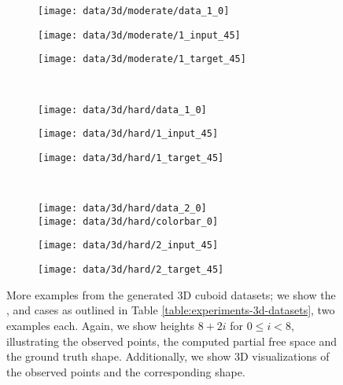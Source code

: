 \begin{figure}[h]
  \begin{subfigure}[t]{0.425\textwidth}
    \vspace{0px}
    \texttt{[image: data/3d/moderate/data\_1\_0]}
  \end{subfigure}
  \begin{subfigure}[t]{0.2\textwidth}
    \vspace{0px}
    \texttt{[image: data/3d/moderate/1\_input\_45]}
  \end{subfigure}
  \begin{subfigure}[t]{0.2\textwidth}
    \vspace{0px}
    \texttt{[image: data/3d/moderate/1\_target\_45]}
  \end{subfigure}\\
  \begin{subfigure}[t]{0.425\textwidth}
    \vspace{0px}
    \texttt{[image: data/3d/hard/data\_1\_0]}
  \end{subfigure}
  \begin{subfigure}[t]{0.2\textwidth}
    \vspace{0px}
    \texttt{[image: data/3d/hard/1\_input\_45]}
  \end{subfigure}
  \begin{subfigure}[t]{0.2\textwidth}
    \vspace{0px}
    \texttt{[image: data/3d/hard/1\_target\_45]}
  \end{subfigure}\\
  \begin{subfigure}[t]{0.425\textwidth}
    \vspace{0px}
    \texttt{[image: data/3d/hard/data\_2\_0]}\\
    \hspace*{-0.25cm}\texttt{[image: data/3d/hard/colorbar\_0]}
  \end{subfigure}
  \begin{subfigure}[t]{0.2\textwidth}
    \vspace{0px}
    \texttt{[image: data/3d/hard/2\_input\_45]}
  \end{subfigure}
  \begin{subfigure}[t]{0.2\textwidth}
    \vspace{0px}
    \texttt{[image: data/3d/hard/2\_target\_45]}
  \end{subfigure}
  
  \caption{More examples from the generated 3D cuboid datasets; we show the \easy,
  \moderate and \hard cases as outlined in Table \ref{table:experiments-3d-datasets},
  two examples each. Again, we show heights $8 + 2i$ for $0 \leq i < 8$, illustrating the
  observed points, the computed partial free space and the ground truth shape.
  Additionally, we show 3D visualizations of the observed points and the corresponding
  shape.}
  \label{fig:appendix-data-3d}
\end{figure}


